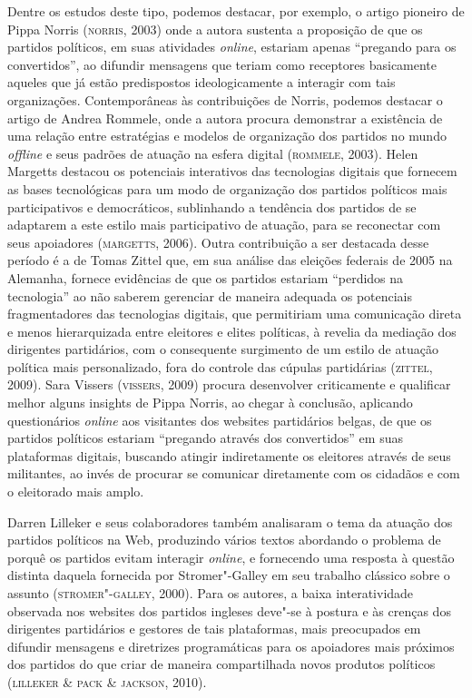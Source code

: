 Dentre os estudos deste tipo, podemos destacar, por exemplo, o artigo
pioneiro de Pippa Norris (\textsc{norris}, 2003) onde a autora sustenta a
proposição de que os partidos políticos, em suas atividades \emph{online},
estariam apenas ``pregando para os convertidos'', ao difundir mensagens
que teriam como receptores basicamente aqueles que já estão predispostos
ideologicamente a interagir com tais organizações. Contemporâneas às
contribuições de Norris, podemos destacar o artigo de Andrea Rommele,
onde a autora procura demonstrar a existência de uma relação entre
estratégias e modelos de organização dos partidos no mundo \emph{offline} e
seus padrões de atuação na esfera digital (\textsc{rommele}, 2003). Helen
Margetts destacou os potenciais interativos das tecnologias digitais que
fornecem as bases tecnológicas para um modo de organização dos partidos
políticos mais participativos e democráticos, sublinhando a tendência
dos partidos de se adaptarem a este estilo mais participativo de
atuação, para se reconectar com seus apoiadores (\textsc{margetts}, 2006). Outra
contribuição a ser destacada desse período é a de Tomas Zittel que, em
sua análise das eleições federais de 2005 na Alemanha, fornece
evidências de que os partidos estariam ``perdidos na tecnologia'' ao não
saberem gerenciar de maneira adequada os potenciais fragmentadores das
tecnologias digitais, que permitiriam uma comunicação direta e menos
hierarquizada entre eleitores e elites políticas, à revelia da mediação
dos dirigentes partidários, com o consequente surgimento de um estilo de
atuação política mais personalizado, fora do controle das cúpulas
partidárias (\textsc{zittel}, 2009). Sara Vissers (\textsc{vissers}, 2009) procura
desenvolver criticamente e qualificar melhor alguns insights de Pippa
Norris, ao chegar à conclusão, aplicando questionários \emph{online} aos
visitantes dos websites partidários belgas, de que os partidos políticos
estariam ``pregando através dos convertidos'' em suas plataformas
digitais, buscando atingir indiretamente os eleitores através de seus
militantes, ao invés de procurar se comunicar diretamente com os
cidadãos e com o eleitorado mais amplo.

Darren Lilleker e seus colaboradores também analisaram o tema da atuação
dos partidos políticos na Web, produzindo vários textos abordando o
problema de porquê os partidos evitam interagir \emph{online}, e fornecendo uma
resposta à questão distinta daquela fornecida por Stromer"-Galley em seu
trabalho clássico sobre o assunto (\textsc{stromer"-galley}, 2000). Para os
autores, a baixa interatividade observada nos websites dos partidos
ingleses deve"-se à postura e às crenças dos dirigentes partidários e
gestores de tais plataformas, mais preocupados em difundir mensagens e
diretrizes programáticas para os apoiadores mais próximos dos partidos
do que criar de maneira compartilhada novos produtos políticos (\textsc{lilleker}
\& \textsc{pack} \& \textsc{jackson}, 2010).

